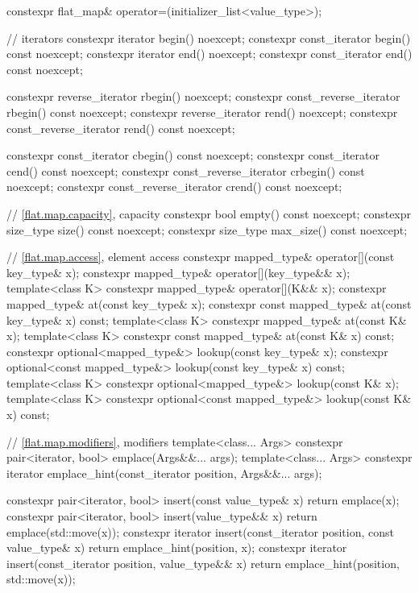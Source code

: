 \begin{codeblock}
{{    constexpr flat_map& operator=(initializer_list<value_type>);

    // iterators
    constexpr iterator               begin() noexcept;
    constexpr const_iterator         begin() const noexcept;
    constexpr iterator               end() noexcept;
    constexpr const_iterator         end() const noexcept;

    constexpr reverse_iterator       rbegin() noexcept;
    constexpr const_reverse_iterator rbegin() const noexcept;
    constexpr reverse_iterator       rend() noexcept;
    constexpr const_reverse_iterator rend() const noexcept;

    constexpr const_iterator         cbegin() const noexcept;
    constexpr const_iterator         cend() const noexcept;
    constexpr const_reverse_iterator crbegin() const noexcept;
    constexpr const_reverse_iterator crend() const noexcept;

    // \ref{flat.map.capacity}, capacity
    constexpr bool empty() const noexcept;
    constexpr size_type size() const noexcept;
    constexpr size_type max_size() const noexcept;

    // \ref{flat.map.access}, element access
    constexpr mapped_type& operator[](const key_type& x);
    constexpr mapped_type& operator[](key_type&& x);
    template<class K> constexpr mapped_type& operator[](K&& x);
    constexpr mapped_type& at(const key_type& x);
    constexpr const mapped_type& at(const key_type& x) const;
    template<class K> constexpr mapped_type& at(const K& x);
    template<class K> constexpr const mapped_type& at(const K& x) const;
    constexpr optional<mapped_type&>       lookup(const key_type& x);
    constexpr optional<const mapped_type&> lookup(const key_type& x) const;
    template<class K> constexpr optional<mapped_type&>       lookup(const K& x);
    template<class K> constexpr optional<const mapped_type&> lookup(const K& x) const;

    // \ref{flat.map.modifiers}, modifiers
    template<class... Args> constexpr pair<iterator, bool> emplace(Args&&... args);
    template<class... Args>
      constexpr iterator emplace_hint(const_iterator position, Args&&... args);

    constexpr pair<iterator, bool> insert(const value_type& x)
      { return emplace(x); }
    constexpr pair<iterator, bool> insert(value_type&& x)
      { return emplace(std::move(x)); }
    constexpr iterator insert(const_iterator position, const value_type& x)
      { return emplace_hint(position, x); }
    constexpr iterator insert(const_iterator position, value_type&& x)
      { return emplace_hint(position, std::move(x)); }

}}
\end{codeblock}
